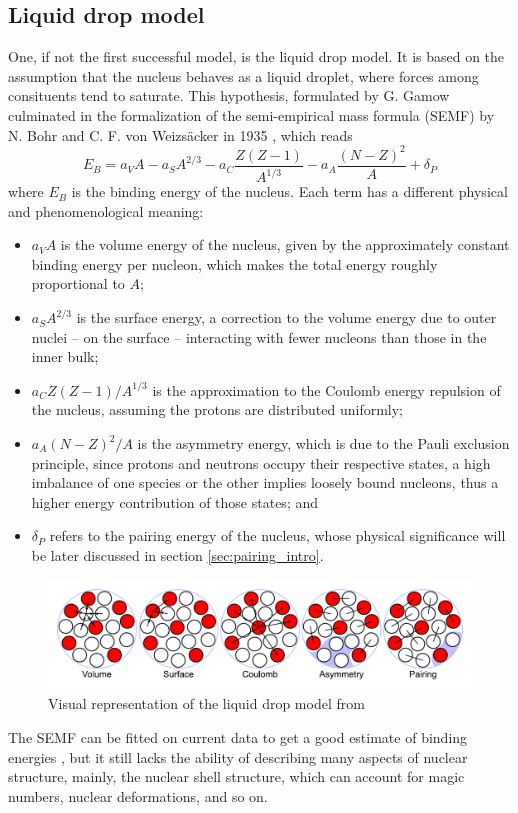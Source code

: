\subsection{Liquid drop model}
One, if not the first successful model, is the liquid drop model. It is based on the assumption that the nucleus behaves as a liquid droplet, where forces among consituents tend to saturate. This hypothesis, formulated by G. Gamow culminated in the formalization of the semi-empirical mass formula (SEMF) by N. Bohr and C. F. von Weizsäcker in 1935 \cite{Weizsacker1935}, which reads
\begin{equation}
    \label{eq:semf}
    E_B=a_V A - a_S A^{2/3} - a_C \frac{Z(Z-1)}{A^{1/3}} - a_A \frac{(N-Z)^2}{A} + \delta_P
\end{equation}
where $E_B$ is the binding energy of the nucleus. Each term has a different physical and phenomenological meaning:
\begin{itemize}
    \item $a_V A$ is the volume energy of the nucleus, given by the approximately constant binding energy per nucleon, which makes the total energy roughly proportional to $A$;
    \item $a_S A^{2/3}$ is the surface energy, a correction to the volume energy due to outer nuclei -- on the surface -- interacting with fewer nucleons than those in the inner bulk;
    \item $a_C Z(Z-1)/A^{1/3}$ is the approximation to the Coulomb energy repulsion of the nucleus, assuming the protons are distributed uniformly;
    \item $a_A (N-Z)^2/A$ is the asymmetry energy, which is due to the Pauli exclusion principle, since protons and neutrons occupy their respective states, a high imbalance of one species or the other implies loosely bound nucleons, thus a higher energy contribution of those states; and
    \item $\delta_P$ refers to the pairing energy of the nucleus, whose physical significance will be later discussed in section \ref{sec:pairing_intro}.
\end{itemize}
\begin{figure}[h]
    \centering
    \includegraphics[width=1.0\textwidth]{Images/Liquid_drop_model.pdf}
    \caption{Visual representation of the liquid drop model from \cite{ldmimg}}
    \label{fig:liquid_drop_model}
\end{figure}
The SEMF can be fitted on current data to get a good estimate of binding energies \cite{Benzaid2020}, but it still lacks the ability of describing many aspects of nuclear structure, mainly, the nuclear shell structure, which can account for magic numbers, nuclear deformations, and so on.
